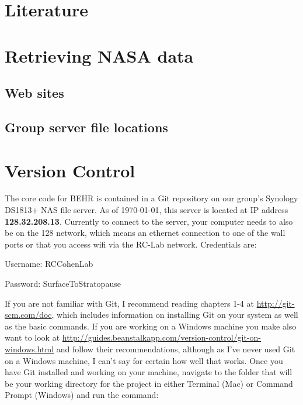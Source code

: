 \documentclass[12pt]{article}
\begin{document}
\section{Literature}

\section{Retrieving NASA data}
	\subsection{Web sites}
	\subsection{Group server file locations}

\section{Version Control}
	
	The core code for BEHR is contained in a Git repository on our group's Synology DS1813+ NAS file server.  As of \today, this server is located at IP address \textbf{128.32.208.13}.  Currently to connect to the server, your computer needs to also be on the 128 network, which means an ethernet connection to one of the wall ports or that you access wifi via the RC-Lab network.  Credentials are:
	
	\vspace{12pt}
	Username: RCCohenLab
	
	Password: SurfaceToStratopause
	
	\vspace{12pt}
	If you are not familiar with Git, I recommend reading chapters 1-4 at \url{http://git-scm.com/doc}, which includes information on installing Git on your system as well as the basic commands.  If you are working on a Windows machine you make also want to look at \url{http://guides.beanstalkapp.com/version-control/git-on-windows.html} and follow their recommendations, although as I've never used Git on a Windows machine, I can't say for certain how well that works.  
	Once you have Git installed and working on your machine, navigate to the folder that will be your working directory for the project in either Terminal (Mac) or Command Prompt (Windows) and run the command:

\vspace{12pt}\begin{sloppypar}
	\end{sloppypar}
	
\end{document}
